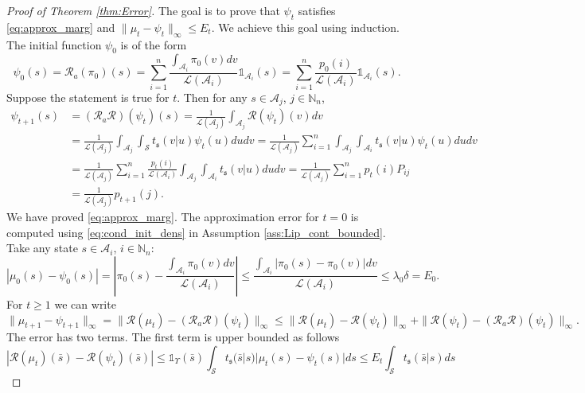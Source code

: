 \documentclass{LMCS}
\begin{document}
\begin{proof}[Proof of Theorem \ref{thm:Error}]
The goal is to
prove that $\psi_t$ satisfies \eqref{eq:approx_marg} and $\|\mu_t-\psi_t\|_\infty\le E_t$.
We achieve this goal using induction. The initial function $\psi_0$ is of the form
\begin{equation*}
\psi_{0}(s) = \mathcal R_a(\pi_0)(s)
= \sum_{i=1}^{n}\frac{\int_{\mathcal A_i}\pi_0(v)dv}{\mathcal L(\mathcal A_i)}\mathds 1_{\mathcal A_i}(s)
= \sum_{i=1}^{n}\frac{p_0(i)}{\mathcal L(\mathcal A_i)}\mathds 1_{\mathcal A_i}(s).
\end{equation*}
Suppose the statement is true for $t$. Then for any $s\in\mathcal A_j$, $j\in\mathbb N_n$,
\begin{align*}
\psi_{t+1}(s) & =(\mathcal R_a\mathcal R )(\psi_t)(s)
= \frac{1}{\mathcal L(\mathcal A_j)}\int_{\mathcal A_j}\mathcal R(\psi_t)(v)dv\\
& = \frac{1}{\mathcal L(\mathcal A_j)}\int_{\mathcal A_j}\int_{\mathcal S}t_{\mathfrak s}(v|u)\psi_t(u)du dv
= \frac{1}{\mathcal L(\mathcal A_j)}\sum_{i=1}^{n}\int_{\mathcal A_j}\int_{\mathcal A_i}t_{\mathfrak s}(v|u)\psi_t(u)du dv\\
& = \frac{1}{\mathcal L(\mathcal A_j)}\sum_{i=1}^{n}
\frac{p_t(i)}{\mathcal L(\mathcal A_i)}\int_{\mathcal A_j}\int_{\mathcal A_i}t_{\mathfrak s}(v|u)du dv
= \frac{1}{\mathcal L(\mathcal A_j)}\sum_{i=1}^{n}p_t(i) P_{ij}\\
&= \frac{1}{\mathcal L(\mathcal A_j)}p_{t+1}(j).
\end{align*}
We have proved \eqref{eq:approx_marg}.
The approximation error for $t=0$ is computed using \eqref{eq:cond_init_dens} in Assumption \ref{ass:Lip_cont_bounded}. Take any state $s\in\mathcal A_i$, $i\in\mathbb N_n$:
\begin{equation*}
|\mu_0(s)-\psi_0(s)| = \left|\pi_0(s)- \frac{\int_{\mathcal A_i}\pi_0(v)dv}{\mathcal L(\mathcal A_i)}\right|
\le \frac{\int_{\mathcal A_i}|\pi_0(s)-\pi_0(v)|dv}{\mathcal L(\mathcal A_i)}\le \lambda_0\delta = E_0.
\end{equation*}
For $t\ge 1$ we can write
\begin{equation*}
\|\mu_{t+1}-\psi_{t+1}\|_\infty = \|\mathcal R(\mu_t)-(\mathcal R_a\mathcal R )(\psi_t)\|_\infty
\le \| \mathcal R(\mu_t)-\mathcal R(\psi_t)\|_\infty + \|\mathcal R(\psi_t)-(\mathcal R_a\mathcal R )(\psi_t)\|_\infty.
\end{equation*}
The error has two terms. The first term is upper bounded as follows
\begin{equation*}
|\mathcal R(\mu_t)(\bar s)-\mathcal R(\psi_t)(\bar s)| 
\le\mathds 1_{\Upsilon}(\bar s) \int_{\mathcal S}t_{\mathfrak s}(\bar s|s)|\mu_t(s)-\psi_t(s)|ds\le E_t\int_{\mathcal S}t_{\mathfrak s}(\bar s|s)ds

\end{equation*}
\end{proof}
\end{document}
